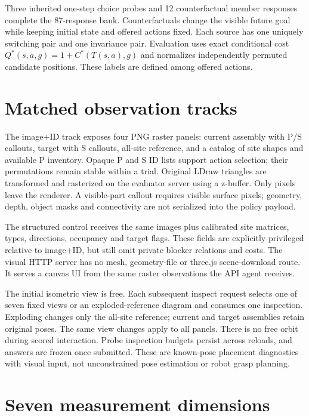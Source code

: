 \documentclass[10pt,twocolumn]{article}
\begin{document}
Three inherited one-step choice probes and 12 counterfactual member responses
complete the 87-response bank. Counterfactuals change the visible future
goal while keeping initial state and offered actions fixed. Each source has
one uniquely switching pair and one invariance pair. Evaluation uses exact
conditional cost $Q^*(s,a,g)=1+C^*(T(s,a),g)$ and normalizes independently
permuted candidate positions. These labels are defined among offered actions.

\section{Matched observation tracks}
The image+ID track exposes four PNG raster panels: current assembly with P/S
callouts, target with S callouts, all-site reference, and a catalog of site
shapes and available P inventory. Opaque P and S ID lists support action
selection; their permutations remain stable within a trial. Original LDraw
triangles are transformed and rasterized on the evaluator server using a
z-buffer. Only pixels leave the renderer. A visible-part callout requires
visible surface pixels; geometry, depth, object masks and connectivity are
not serialized into the policy payload.

The structured control receives the same images plus calibrated site
matrices, types, directions, occupancy and target flags. These fields are
explicitly privileged relative to image+ID, but still omit private blocker
relations and costs. The visual HTTP server has no mesh, geometry-file or
three.js scene-download route. It serves a canvas UI from the same raster
observations the API agent receives.

The initial isometric view is free. Each subsequent inspect request selects
one of seven fixed views or an exploded-reference diagram and consumes one
inspection. Exploding changes only the all-site reference; current and target
assemblies retain original poses. The same view changes apply to all panels.
There is no free orbit during scored interaction. Probe inspection budgets
persist across reloads, and answers are frozen once submitted.
These are known-pose placement diagnostics with visual input, not
unconstrained pose estimation or robot grasp planning.

\section{Seven measurement dimensions}
\end{document}
